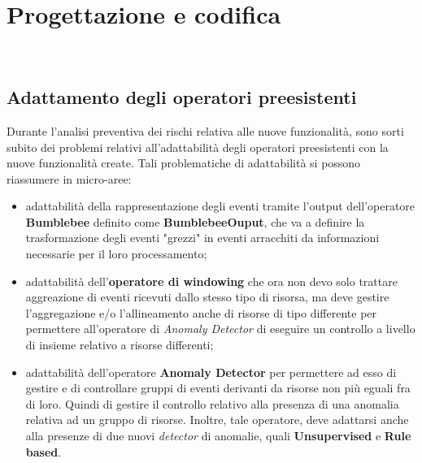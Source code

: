 
\chapter{Progettazione e codifica}
\label{cap:progettazione-codifica}

\\

\section{Adattamento degli operatori preesistenti}
Durante l'analisi preventiva dei rischi relativa alle nuove funzionalità, sono sorti subito dei problemi relativi all'adattabilità degli operatori preesistenti con la nuove funzionalità create. Tali problematiche di adattabilità si possono riassumere in micro-aree:

\begin{itemize}
	\item{adattabilità della rappresentazione degli eventi tramite l'output dell'operatore \textbf{Bumblebee} definito come \textbf{BumblebeeOuput}, che va a definire la trasformazione degli eventi "grezzi" in eventi arracchiti da informazioni necessarie per il loro processamento;}
	\item{adattabilità dell'\textbf{operatore di windowing} che ora non devo solo trattare aggreazione di eventi ricevuti dallo stesso tipo di risorsa, ma deve gestire l'aggregazione e/o l'allineamento anche di risorse di tipo differente per permettere all'operatore di \textit{Anomaly Detector} di eseguire un controllo a livello di insieme relativo a risorse differenti;}
	\item{adattabilità dell'operatore \textbf{Anomaly Detector} per permettere ad esso di gestire e di controllare gruppi di eventi derivanti da risorse non più eguali fra di loro. Quindi di gestire il controllo relativo alla presenza di una anomalia relativa ad un gruppo di risorse. Inoltre, tale operatore, deve adattarsi anche alla presenze di due nuovi \textit{detector} di anomalie, quali \textbf{Unsupervised} e \textbf{Rule based}.}
\end{itemize}
	
